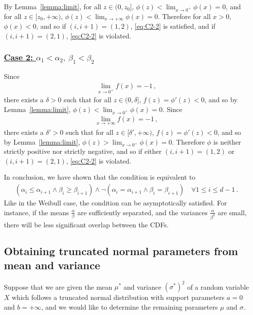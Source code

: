 \documentclass{article}
\begin{document}
%
By Lemma~\ref{lemma:limit}, for all $z \in (0, z_0]$,
$\phi(z) < \lim_{x\to 0^+}\phi(x)=0$, and for all $z \in[z_0, +\infty)$,
$\phi(z) < \lim_{x \to +\infty} \phi(x) = 0$.
Therefore for all $x > 0$, $\phi(x) < 0$, and so if $(i, i + 1)=(1, 2)$,
\eqref{eq:C2-2} is satisfied, and if $(i, i + 1) = (2, 1)$,
\eqref{eq:C2-2} is violated.
%
\subsubsection*{\underline{Case 2: $\alpha_1 < \alpha_2, \  \beta_1 < \beta_2$}}
%

%
Since
%
\begin{align*}
	\lim_{x \to 0^+} f(x) = -1 \,,
\end{align*}
%
there exists a $\delta > 0$ such that for all $z \in (0, \delta]$,
$f(z) = \phi'(z) < 0$, and so by Lemma~\ref{lemma:limit},
$\phi(z) < \lim_{x \to 0^+} \phi(x) = 0$. Since
%
\begin{align*}
	\lim_{x \to +\infty} f(x) = -1 \,,
\end{align*}
%
there exists a $\delta' > 0$ such that for all $z \in [\delta', +\infty)$,
$f(z) = \phi'(z) < 0$, and so by Lemma~\ref{lemma:limit},
$\phi(z) > \lim_{x \to 0^+} \phi(x) = 0$.
Therefore $\phi$ is neither strictly positive nor strictly negative,
and so if either $(i, i + 1) = (1, 2)$ or
$(i, i + 1) = (2, 1)$, \eqref{eq:C2-2} is violated.
%

%
In conclusion, we have shown that the condition is equivalent to
%
\begin{align*}
	(\alpha_i \leq \alpha_{i + 1} \land \beta_{i}
	\geq \beta_{i + 1}) \land \neg(\alpha_i = \alpha_{i+1} \land \beta_i
	= \beta_{i + 1}) \quad \forall 1 \leq i\leq d - 1 \,.
\end{align*}
%
Like in the Weibull case, the condition can be asymptotically satisfied.
For instance, if the means $\frac{\alpha}{\beta}$ are sufficiently separated,
and the variances $\frac{\alpha}{\beta ^ 2}$ are small,
there will be less significant overlap between the CDFs.
%
\subsection{Obtaining truncated normal parameters from mean and variance}
\label{appendix:tn-invert}
%

%
Suppose that we are given the mean $\mu^*$ and variance $(\sigma^*) ^ 2$
of a random variable $X$ which follows a truncated normal distribution
with support parameters $a = 0$ and $b = +\infty$,
and we would like to determine the remaining parameters $\mu$ and $\sigma$.
\end{document}
